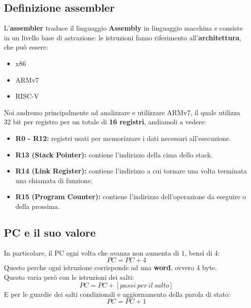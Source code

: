 \documentclass[12pt,a4paper]{article}
\begin{document}
\subsection{Definizione assembler}
L'\textbf{assembler} traduce il linguaggio \textbf{Assembly} in linguaggio macchina e consiste in un livello base di astrazione: le istruzioni fanno riferimento all'\textbf{architettura}, che può essere:
\begin{itemize}
    \item x86
    \item ARMv7
    \item RISC-V
\end{itemize}
Noi andremo principalmente ad analizzare e utilizzare ARMv7, il quale utilizza $32$ bit per registro per un totale di \textbf{16 registri}, andiamoli a vedere:
\begin{itemize}
    \item \textbf{R0 - R12:} registri usati per memorizzare i dati necessari all'esecuzione.
    \item \textbf{R13 (Stack Pointer):} contiene l'indirizzo della cima dello stack.
    \item \textbf{R14 (Link Register):} contiene l'indirizzo a cui tornare una volta terminata una chiamata di funzione.
    \item \textbf{R15 (Program Counter):} contiene l'indirizzo dell'operazione da eseguire o della prossima.
\end{itemize}
\subsection{PC e il suo valore}
In particolare, il PC ogni volta che avanza non aumenta di $1$, bensì di $4$:
\[
PC = PC + 4
\]
Questo perche ogni istruzione corrisponde ad una \textbf{word}, ovvero 4 byte.\\
Questo varia però con le istruzioni dei salti:
\[
PC = PC + [passi\ per\ il\ salto]
\]
E per le guardie dei salti condizionali e aggiornamento della parola di stato:
\[
PC = PC + 1
\]
\end{document}
